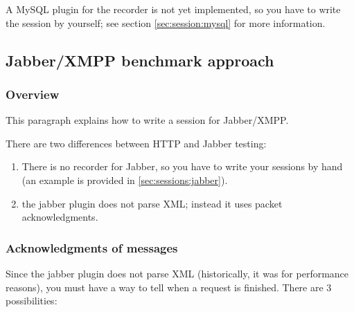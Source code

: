 \documentclass{TSUNG-en}
\begin{document}
A MySQL plugin for the recorder is not yet implemented, so you have to
write the session by yourself; see section \ref{sec:session:mysql} for
more information.

\subsection{Jabber/XMPP benchmark approach}

\subsubsection{Overview}

This paragraph explains how to write a session for Jabber/XMPP.

There are two differences between HTTP and Jabber testing:
\begin{enumerate}
\item There is no recorder for Jabber, so you have to write your
  sessions by hand (an example is provided in
  \ref{sec:sessions:jabber}).
\item the jabber plugin does not parse XML; instead it uses packet
  acknowledgments.
\end{enumerate}


\subsubsection{Acknowledgments of messages}

Since the jabber plugin does not parse XML (historically, it was for
performance reasons), you must have a way to tell when a request is
finished. There are 3 possibilities:
\end{document}
